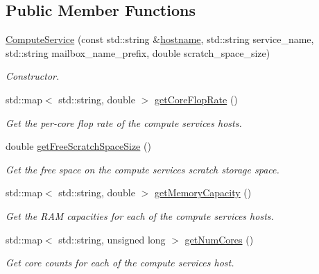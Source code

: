 \subsection*{Public Member Functions}
\begin{DoxyCompactItemize}
\item 
\hyperlink{classwrench_1_1_compute_service_abccb305cb121b093931392c937aa86e2}{Compute\+Service} (const std\+::string \&\hyperlink{classwrench_1_1_s4_u___daemon_a52bc0b9a6cd248310749dac086819f00}{hostname}, std\+::string service\+\_\+name, std\+::string mailbox\+\_\+name\+\_\+prefix, double scratch\+\_\+space\+\_\+size)
\begin{DoxyCompactList}\small\item\em Constructor. \end{DoxyCompactList}\item 
std\+::map$<$ std\+::string, double $>$ \hyperlink{classwrench_1_1_compute_service_a72c2608b82692ad73888d9b9f7c6bd0c}{get\+Core\+Flop\+Rate} ()
\begin{DoxyCompactList}\small\item\em Get the per-\/core flop rate of the compute service\textquotesingle{}s hosts. \end{DoxyCompactList}\item 
double \hyperlink{classwrench_1_1_compute_service_ac3662628f589ffe44e17921e60971fd6}{get\+Free\+Scratch\+Space\+Size} ()
\begin{DoxyCompactList}\small\item\em Get the free space on the compute service\textquotesingle{}s scratch storage space. \end{DoxyCompactList}\item 
std\+::map$<$ std\+::string, double $>$ \hyperlink{classwrench_1_1_compute_service_a113d9698fc83cefd78121e279b99b51e}{get\+Memory\+Capacity} ()
\begin{DoxyCompactList}\small\item\em Get the R\+AM capacities for each of the compute service\textquotesingle{}s hosts. \end{DoxyCompactList}\item 
std\+::map$<$ std\+::string, unsigned long $>$ \hyperlink{classwrench_1_1_compute_service_a0d88426f33110e811771f73f39c6458a}{get\+Num\+Cores} ()
\begin{DoxyCompactList}\small\item\em Get core counts for each of the compute service\textquotesingle{}s host. \end{DoxyCompactList}\item 

\end{DoxyCompactItemize}
